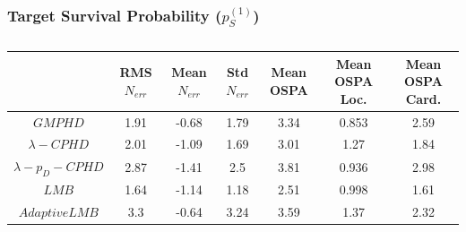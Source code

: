 \documentclass{article}
\begin{document}
\subsubsection*{Target Survival Probability ($p_S^{(1)}$)}
\begin{table}[H]
  \centering
\begin{tabular}{ c| c | c | c | c | c | c }
   & RMS $N_{err}$ & Mean $N_{err}$ & Std $N_{err}$ & Mean OSPA & Mean OSPA Loc. & Mean OSPA Card.\\
\hline
  $GMPHD$ & 1.91 & -0.68 & 1.79 & 3.34 & 0.853 & 2.59 \\
  $\lambda-CPHD$ & 2.01 & -1.09 & 1.69 & 3.01 & 1.27 & 1.84 \\
  $\lambda-p_D-CPHD$ & 2.87 & -1.41 & 2.5 & 3.81 & 0.936 & 2.98 \\
  $LMB$ & 1.64 & -1.14 & 1.18 & 2.51 & 0.998 & 1.61 \\
  $Adaptive LMB$ & 3.3 & -0.64 & 3.24 & 3.59 & 1.37 & 2.32 \\
\end{tabular}
  \caption{}
  \label{tab:}
\end{table}
\end{document}
